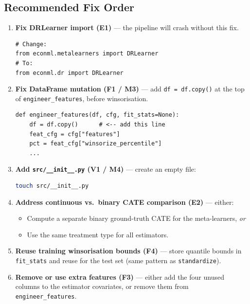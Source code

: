 \documentclass[11pt, letterpaper]{article}
\begin{document}
\subsection{Recommended Fix Order}

\begin{enumerate}[leftmargin=2em]
    \item \textbf{Fix DRLearner import (E1)} --- the pipeline will crash without this fix.
    \begin{lstlisting}[numbers=none]
# Change:
from econml.metalearners import DRLearner
# To:
from econml.dr import DRLearner
    \end{lstlisting}

    \item \textbf{Fix DataFrame mutation (F1 / M3)} --- add \texttt{df = df.copy()} at the top of \texttt{engineer\_features}, before winsorisation.
    \begin{lstlisting}[numbers=none]
def engineer_features(df, cfg, fit_stats=None):
    df = df.copy()      # <-- add this line
    feat_cfg = cfg["features"]
    pct = feat_cfg["winsorize_percentile"]
    ...
    \end{lstlisting}

    \item \textbf{Add \texttt{src/\_\_init\_\_.py} (V1 / M4)} --- create an empty file:
    \begin{lstlisting}[language=bash, numbers=none]
touch src/__init__.py
    \end{lstlisting}

    \item \textbf{Address continuous vs.\ binary CATE comparison (E2)} --- either:
    \begin{itemize}
        \item Compute a separate binary ground-truth CATE for the meta-learners, \emph{or}
        \item Use the same treatment type for all estimators.
    \end{itemize}

    \item \textbf{Reuse training winsorisation bounds (F4)} --- store quantile bounds in \texttt{fit\_stats} and reuse for the test set (same pattern as \texttt{standardize}).

    \item \textbf{Remove or use extra features (F3)} --- either add the four unused columns to the estimator covariates, or remove them from \texttt{engineer\_features}.
\end{enumerate}

\end{document}
